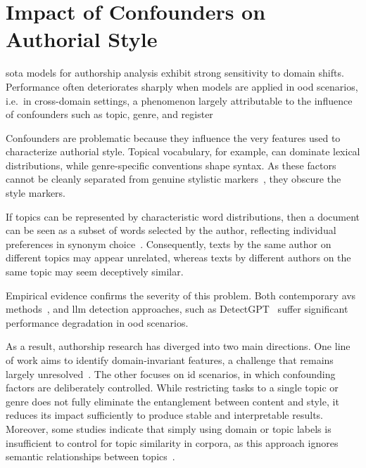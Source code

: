 \section{Impact of Confounders on Authorial Style}
\label{sec:contextual_factors}

\Acl{sota} models for authorship analysis exhibit strong sensitivity to domain shifts. 
Performance often deteriorates sharply when models are applied in \ac{ood} scenarios, i.e.\ in cross-domain settings, a phenomenon largely attributable to the influence of confounders such as topic, genre, and register~\citep{Sundararajan_style_18,bischoff_importance_2020}

Confounders are problematic because they influence the very features used to characterize authorial style. 
Topical vocabulary, for example, can dominate lexical distributions, while genre-specific conventions shape syntax. 
As these factors cannot be cleanly separated from genuine stylistic markers~\citep{bischoff_importance_2020}, they obscure the style markers.

If topics can be represented by characteristic word distributions, then a document can be seen as a subset of words selected by the author, reflecting individual preferences in synonym choice~\citep{altakrori_topic_2021}. 
Consequently, texts by the same author on different topics may appear unrelated, whereas texts by different authors on the same topic may seem deceptively similar.

Empirical evidence confirms the severity of this problem.
Both contemporary \acp{av} methods~\citep{Thomas_cross_topic_24}, and \ac{llm} detection approaches, such as DetectGPT~\citep{mitchell_detectgpt_2023,Wu_ODD_challenges_2025} suffer significant performance degradation in \ac{ood} scenarios.

As a result, authorship research has diverged into two main directions. 
One line of work aims to identify domain-invariant features, a challenge that remains largely unresolved~\citep{bischoff_importance_2020}. 
The other focuses on \ac{id} scenarios, in which confounding factors are deliberately controlled. 
While restricting tasks to a single topic or genre does not fully eliminate the entanglement between content and style, it reduces its impact sufficiently to produce stable and interpretable results. 
Moreover, some studies indicate that simply using domain or topic labels is insufficient to control for topic similarity in corpora, as this approach ignores semantic relationships between topics~\citep{sawatphol_cross_topic_av_24}.
